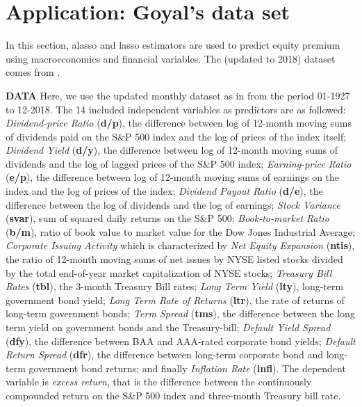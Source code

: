 \documentclass[12pt,a4paper]{article}
\begin{document}
\section{Application: Goyal's data set}
In this section, alasso and lasso estimators are used to predict equity premium using macroeconomics and financial variables. The (updated to 2018) dataset comes from \cite{welch2008comprehensive}.

\textbf{DATA} Here, we use the updated monthly dataset as in \citep{welch2008comprehensive} from the period 01-1927 to 12-2018. The 14 included independent variables as predictors are as followed: \textit{Dividend-price Ratio} (\textbf{d/p}), the difference between log of 12-month moving sums of dividends paid on the S\&P 500 index and the log of prices of the index itself; \textit{Dividend Yield} (\textbf{d/y}), the difference between log of 12-month moving sums of dividends and the log of lagged prices of the S\&P 500 index; \textit{Earning-price Ratio} (\textbf{e/p}), the difference between log of 12-month moving sums of earnings on the index and the log of prices of the index; \textit{Dividend Payout Ratio} (\textbf{d/e}), the difference between the log of dividends and the log of earnings; \textit{Stock Variance} (\textbf{svar}), sum of squared daily returns on the S\&P 500; \textit{Book-to-market Ratio} (\textbf{b/m}), ratio of book value to market value for the Dow Jones Industrial Average; \textit{Corporate Issuing Activity} which is characterized by \textit{Net Equity Expansion} (\textbf{ntis}), the ratio of 12-month moving sums of net issues by NYSE listed stocks divided by the total end-of-year market capitalization of NYSE stocks; \textit{Treasury Bill Rates} (\textbf{tbl}), the 3-month Treasury Bill rates; \textit{Long Term Yield} (\textbf{lty}), long-term government bond yield; \textit{Long Term Rate of Returns} (\textbf{ltr}), the rate of returns of long-term government bonds; \textit{Term Spread} (\textbf{tms}), the difference between the long term yield on government bonds and the Treasury-bill; \textit{Default Yield Spread} (\textbf{dfy}), the difference between BAA and AAA-rated corporate bond yields; \textit{Default Return Spread} (\textbf{dfr}), the difference between long-term corporate bond and long-term government bond returns; and finally \textit{Inflation Rate} (\textbf{infl}). The dependent variable is \textit{excess return}, that is the difference between the continuously compounded return on the S\&P 500 index and three-month Treasury bill rate. 
\end{document}
